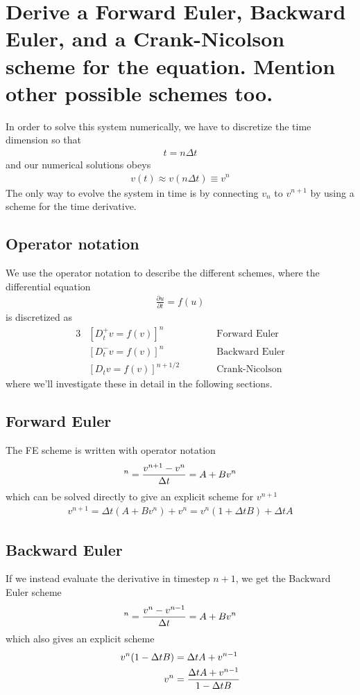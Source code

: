 \documentclass[a4paper,10pt]{article}
\renewcommand{\(}{\left(}
\renewcommand{\)}{\right)}
\newcommand{\dpart}[2]{\frac{\partial#1}{\partial#2}}
\begin{document}
\section{Derive a Forward Euler, Backward Euler, and a Crank-Nicolson scheme for the equation. Mention other possible schemes too.}
In order to solve this system numerically, we have to discretize the time dimension so that
\begin{align*}
  t = n\Delta t
\end{align*}
and our numerical solutions obeys
\begin{align*}
  v(t) \approx v(n\Delta t) \equiv v^n
\end{align*}
The only way to evolve the system in time is by connecting $v_n$ to $v^{n+1}$ by using a scheme for the time derivative. 
\subsection{Operator notation}
We use the operator notation to describe the different schemes, where the differential equation
\begin{align*}
  \dpart{u}{t} = f(u)
\end{align*}
is discretized as
\begin{alignat}{3}
  &[D^+_tv = f(v)]^n & \qquad \quad \text{Forward Euler}\\
  &[D^-_tv = f(v)]^n & \qquad \quad \text{Backward Euler}\\
  &[D_tv = f(v)]^{n+1/2} & \qquad \quad \text{Crank-Nicolson}
\end{alignat}
where we'll investigate these in detail in the following sections.

\subsection{Forward Euler}
The FE scheme is written with operator notation
\begin{align*}
  [D^+_tv = A + Bv]^n = {v^{n+1} - v^n \over \Delta t} = A + Bv^n
\end{align*}
which can be solved directly to give an explicit scheme for $v^{n+1}$
\begin{align}
  \label{eq:forward_euler}
  v^{n+1} = \Delta t(A + Bv^n) + v^n = v^n(1 + \Delta t B) + \Delta tA
\end{align}
\subsection{Backward Euler}
If we instead evaluate the derivative in timestep $n+1$, we get the Backward Euler scheme
\begin{align*}
  [D^-_tv = A + Bv]^n = {v^{n} - v^{n-1} \over \Delta t} = A + Bv^n
\end{align*}
which also gives an explicit scheme
\begin{align*}
  v^n(1 - \Delta t B) &= \Delta t A + v^{n-1}\\
  v^n &= {\Delta t A + v^{n-1} \over 1 - \Delta t B}
\end{align*}
\end{document}
